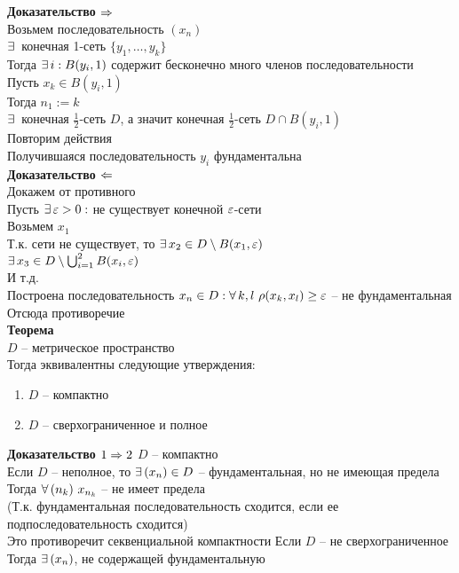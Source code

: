 \documentclass[12pt]{article}
\begin{document}
\textbf{Доказательство $\Rightarrow$}\\
Возьмем последовательность $(x_n)$\\
$\exists\,$ конечная 1-сеть $\{y_1, \ldots, y_k\}$\\
Тогда $\exists\, i: B(y_i, 1)$ содержит бесконечно много членов последовательности\\
Пусть $x_k \in B(y_i, 1)$\\
Тогда $n_1 := k$\\
$\exists\,$ конечная $\frac12$-сеть $D$, а значит конечная $\frac12$-сеть $D \cap B(y_i, 1)$\\
Повторим действия\\
Получившаяся последовательность $y_i$ фундаментальна\\
\textbf{Доказательство $\Leftarrow$}\\
Докажем от противного\\
Пусть $\exists\, \varepsilon > 0:$ не существует конечной $\varepsilon$-сети\\
Возьмем $x_1$\\
Т.к. сети не существует, то $\exists\, x_2 \in D \setminus B(x_1, \varepsilon)$\\
$\exists\, x_3 \in D \setminus \bigcup_{i=1}^2 B(x_i, \varepsilon)$\\
И т.д.\\
Построена последовательность $x_n \in D: \forall\, k, l\ \rho(x_k, x_l) \geq \varepsilon$ -- не фундаментальная\\
Отсюда противоречие\\
\textbf{Теорема}\\
$D$ -- метрическое пространство\\
Тогда эквивалентны следующие утверждения:
\begin{enumerate}
    \item $D$ -- компактно
    \item $D$ -- сверхограниченное и полное
\end{enumerate}
\textbf{Доказательство $1 \Rightarrow 2$}
$D$ -- компактно\\
Если $D$ -- неполное, то $\exists\, (x_n) \in D$ -- фундаментальная, но не имеющая предела\\
Тогда $\forall\, (n_k)\ x_{n_k}$ -- не имеет предела\\
(Т.к. фундаментальная последовательность сходится, если ее подпоследовательность сходится)\\
Это противоречит секвенциальной компактности
Если $D$ -- не сверхограниченное\\
Тогда $\exists\, (x_n)$, не содержащей фундаментальную\\
\end{document}
